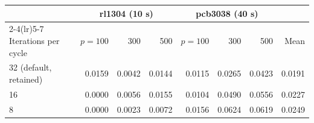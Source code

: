 \begin{tabular}{lrrrrrrr}
\toprule
 & \multicolumn{3}{c}{rl1304 (10 s)} & \multicolumn{3}{c}{pcb3038 (40 s)} & \\
\cmidrule(lr){2-4}\cmidrule(lr){5-7}
Iterations per cycle & $p=100$ & 300 & 500 & $p=100$ & 300 & 500 & Mean \\
\midrule
32 (default, retained) & 0.0159 & 0.0042 & 0.0144 & 0.0115 & 0.0265 & 0.0423 & 0.0191 \\
16 & 0.0000 & 0.0056 & 0.0155 & 0.0104 & 0.0490 & 0.0556 & 0.0227 \\
8 & 0.0000 & 0.0023 & 0.0072 & 0.0156 & 0.0624 & 0.0619 & 0.0249 \\
\bottomrule
\end{tabular}